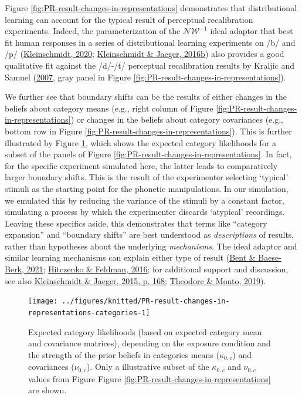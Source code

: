 \documentclass[
  11pt,
  english,
  man,floatsintext]{apa6}
\begin{document}
Figure \ref{fig:PR-result-changes-in-representations} demonstrates that distributional learning can account for the typical result of perceptual recalibration experiments. Indeed, the parameterization of the \(\mathcal{NW}^{-1}\) ideal adaptor that best fit human responses in a series of distributional learning experiments on /b/ and /p/ (\protect\hyperlink{ref-kleinschmidt2020}{Kleinschmidt, 2020}; \protect\hyperlink{ref-kleinschmidt-jaeger2016cogsci}{Kleinschmidt \& Jaeger, 2016b}) also provides a good qualitative fit against the /d/-/t/ perceptual recalibration results by Kraljic and Samuel (\protect\hyperlink{ref-kraljic-samuel2007}{2007}, gray panel in Figure \ref{fig:PR-result-changes-in-representations}).

We further see that boundary shifts can be the results of either changes in the beliefs about category means (e.g., right column of Figure \ref{fig:PR-result-changes-in-representations}) or changes in the beliefs about category covariances (e.g., bottom row in Figure \ref{fig:PR-result-changes-in-representations}). This is further illustrated by Figure \ref{fig:PR-result-changes-in-representations-categories}, which shows the expected category likelihoods for a subset of the panels of Figure \ref{fig:PR-result-changes-in-representations}. In fact, for the specific experiment simulated here, the latter leads to comparatively larger boundary shifts. This is the result of the experimenter selecting `typical' stimuli as the starting point for the phonetic manipulations. In our simulation, we emulated this by reducing the variance of the stimuli by a constant factor, simulating a process by which the experimenter discards `atypical' recordings. Leaving these specifics aside, this demonstrates that terms like ``category expansion'' and ``boundary shifts'' are best understood as \emph{descriptions} of results, rather than hypotheses about the underlying \emph{mechanisms}. The ideal adaptor and similar learning mechanisms can explain either type of result (\protect\hyperlink{ref-bent-baeseberk2021}{Bent \& Baese-Berk, 2021}; \protect\hyperlink{ref-hitczenko-feldman2016}{Hitczenko \& Feldman, 2016}; for additional support and discussion, see also \protect\hyperlink{ref-kleinschmidt-jaeger2015}{Kleinschmidt \& Jaeger, 2015, p. 168}; \protect\hyperlink{ref-theodore-monto2019}{Theodore \& Monto, 2019}).



\begin{figure}

{\centering \texttt{[image: ../figures/knitted/PR-result-changes-in-representations-categories-1]} 

}

\caption{Expected category likelihoods (based on expected category mean and covariance matrices), depending on the exposure condition and the strength of the prior beliefs in categories means (\(\kappa_{0,c}\)) and covariances (\(\nu_{0,c}\)). Only a illustrative subset of the \(\kappa_{0,c}\) and \(\nu_{0,c}\) values from Figure Figure \ref{fig:PR-result-changes-in-representations} are shown.}\label{fig:PR-result-changes-in-representations-categories}
\end{figure}
\end{document}
